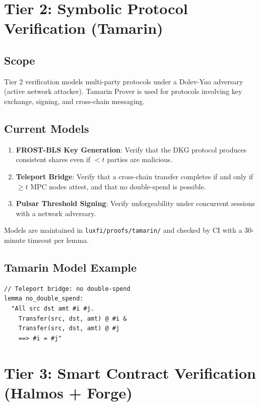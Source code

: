 \documentclass[11pt]{article}
\begin{document}
\section{Tier 2: Symbolic Protocol Verification (Tamarin)}

\subsection{Scope}

Tier 2 verification models multi-party protocols under a Dolev-Yao adversary (active network attacker). Tamarin Prover is used for protocols involving key exchange, signing, and cross-chain messaging.

\subsection{Current Models}

\begin{enumerate}
\item \textbf{FROST-BLS Key Generation}: Verify that the DKG protocol produces consistent shares even if $< t$ parties are malicious.
\item \textbf{Teleport Bridge}: Verify that a cross-chain transfer completes if and only if $\geq t$ MPC nodes attest, and that no double-spend is possible.
\item \textbf{Pulsar Threshold Signing}: Verify unforgeability under concurrent sessions with a network adversary.
\end{enumerate}

Models are maintained in \texttt{luxfi/proofs/tamarin/} and checked by CI with a 30-minute timeout per lemma.

\subsection{Tamarin Model Example}

\begin{verbatim}
// Teleport bridge: no double-spend
lemma no_double_spend:
  "All src dst amt #i #j.
    Transfer(src, dst, amt) @ #i &
    Transfer(src, dst, amt) @ #j
    ==> #i = #j"
\end{verbatim}

\section{Tier 3: Smart Contract Verification (Halmos + Forge)}
\end{document}
